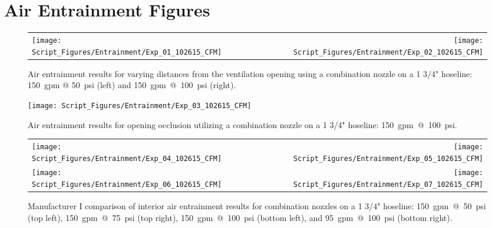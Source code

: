 \documentclass[12pt,oneside]{book}
\begin{document}


\clearpage

\appendix

\chapter{Air Entrainment Figures}
\label{app:Air_Entrainment_Figures}

\begin{figure}[!ht]
\begin{tabular*}{\textwidth}{lr}
\texttt{[image: Script\_Figures/Entrainment/Exp\_01\_102615\_CFM]} &
\texttt{[image: Script\_Figures/Entrainment/Exp\_02\_102615\_CFM]} \\
\end{tabular*}
\caption{Air entrainment results for varying distances from the ventilation opening using a combination nozzle on a 1 3/4" hoseline: 150~gpm @ 50~psi (left) and 150~gpm~@~100~psi (right).}
\label{fig:Distance_Tests}
\end{figure}

\begin{figure}[!ht]
\centering
\texttt{[image: Script\_Figures/Entrainment/Exp\_03\_102615\_CFM]}
\caption{Air entrainment results for opening occlusion utilizing a combination nozzle on a 1 3/4" hoseline: 150~gpm~@~100~psi.}
\label{fig:Opening_Occlusion}
\end{figure}

\clearpage

\begin{figure}[!ht]
\begin{tabular*}{\textwidth}{lr}
\texttt{[image: Script\_Figures/Entrainment/Exp\_04\_102615\_CFM]} &
\texttt{[image: Script\_Figures/Entrainment/Exp\_05\_102615\_CFM]} \\
\texttt{[image: Script\_Figures/Entrainment/Exp\_06\_102615\_CFM]} &
\texttt{[image: Script\_Figures/Entrainment/Exp\_07\_102615\_CFM]} \\
\end{tabular*}
\caption{Manufacturer I comparison of interior air entrainment results for combination nozzles on a 1 3/4" hoseline: 150~gpm~@~50~psi (top left), 150~gpm~@~75~psi (top right), 150~gpm~@~100~psi (bottom left), and 95~gpm~@~100~psi (bottom right).}
\label{fig:1_5_Interior_Combination_Manufacturer_I}
\end{figure}

\clearpage
\end{document}
